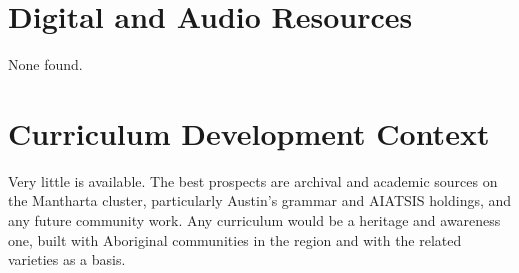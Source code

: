 \documentclass[12pt]{article}
\begin{document}
\section{Digital and Audio Resources}
None found.

\section{Curriculum Development Context}
Very little is available. The best prospects are archival and academic sources on the Mantharta cluster, particularly Austin's grammar and AIATSIS holdings, and any future community work. Any curriculum would be a heritage and awareness one, built with Aboriginal communities in the region and with the related varieties as a basis.
\end{document}
